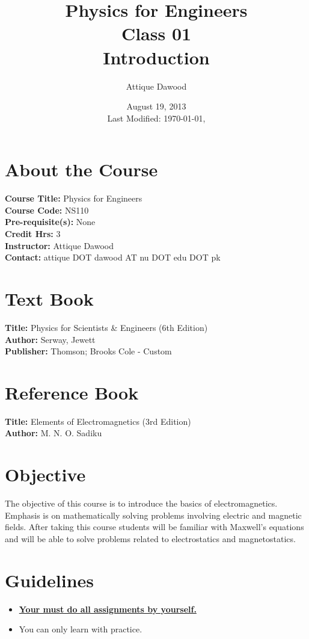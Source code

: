 \documentclass[12pt,a4paper]{article}
\title{\vspace{-2cm}Physics for Engineers\\Class 01\\Introduction}
\author{Attique Dawood}
\date{August 19, 2013\\[0.2cm] Last Modified: \today, \currenttime}
\begin{document}
\maketitle
\section{About the Course}
\textbf{Course Title:} Physics for Engineers\\
\textbf{Course Code:} NS110\\
\textbf{Pre-requisite(s):} None\\
\textbf{Credit Hrs:} 3\\
\textbf{Instructor:} Attique Dawood\\
\textbf{Contact:} attique DOT dawood AT nu DOT edu DOT pk\\
\section{Text Book}
\textbf{Title:} Physics for Scientists \& Engineers  (6th Edition)\\
\textbf{Author:} Serway, Jewett\\
\textbf{Publisher:} Thomson; Brooks Cole - Custom\\
\section{Reference Book}
\textbf{Title:} Elements of Electromagnetics (3rd Edition)\\
\textbf{Author:} M. N. O. Sadiku\\
\section{Objective}
The objective of this course is to introduce the basics of electromagnetics. Emphasis is on mathematically solving problems involving electric and magnetic fields. After taking this course students will be familiar with Maxwell’s equations and will be able to solve problems related to electrostatics and magnetostatics.
\section{Guidelines}
\begin{itemize}
\item \textbf{\underline{Your must do all assignments by yourself.}}
\item You can only learn with practice.
\end{itemize}
\end{document}
